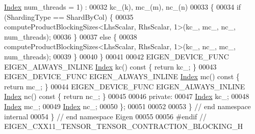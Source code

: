 \begin{DoxyCode}
      \hyperlink{namespace_eigen_a62e77e0933482dafde8fe197d9a2cfde}{Index} num\_threads = 1) :
00032       kc\_(k), mc\_(m), nc\_(n)
00033   \{
00034     \textcolor{keywordflow}{if} (ShardingType == ShardByCol) \{
00035       computeProductBlockingSizes<LhsScalar, RhsScalar, 1>(kc\_, mc\_, nc\_, num\_threads);
00036     \}
00037     \textcolor{keywordflow}{else} \{
00038       computeProductBlockingSizes<LhsScalar, RhsScalar, 1>(kc\_, nc\_, mc\_, num\_threads);
00039     \}
00040   \}
00041 
00042   EIGEN\_DEVICE\_FUNC EIGEN\_ALWAYS\_INLINE \hyperlink{namespace_eigen_a62e77e0933482dafde8fe197d9a2cfde}{Index} kc()\textcolor{keyword}{ const }\{ \textcolor{keywordflow}{return} kc\_; \}
00043   EIGEN\_DEVICE\_FUNC EIGEN\_ALWAYS\_INLINE \hyperlink{namespace_eigen_a62e77e0933482dafde8fe197d9a2cfde}{Index} mc()\textcolor{keyword}{ const }\{ \textcolor{keywordflow}{return} mc\_; \}
00044   EIGEN\_DEVICE\_FUNC EIGEN\_ALWAYS\_INLINE \hyperlink{namespace_eigen_a62e77e0933482dafde8fe197d9a2cfde}{Index} nc()\textcolor{keyword}{ const }\{ \textcolor{keywordflow}{return} nc\_; \}
00045 
00046  \textcolor{keyword}{private}:
00047   \hyperlink{namespace_eigen_a62e77e0933482dafde8fe197d9a2cfde}{Index} kc\_;
00048   \hyperlink{namespace_eigen_a62e77e0933482dafde8fe197d9a2cfde}{Index} mc\_;
00049   \hyperlink{namespace_eigen_a62e77e0933482dafde8fe197d9a2cfde}{Index} nc\_;
00050 \};
00051 
00052 
00053 \} \textcolor{comment}{// end namespace internal}
00054 \} \textcolor{comment}{// end namespace Eigen}
00055 
00056 \textcolor{preprocessor}{#endif // EIGEN\_CXX11\_TENSOR\_TENSOR\_CONTRACTION\_BLOCKING\_H}
\end{DoxyCode}
